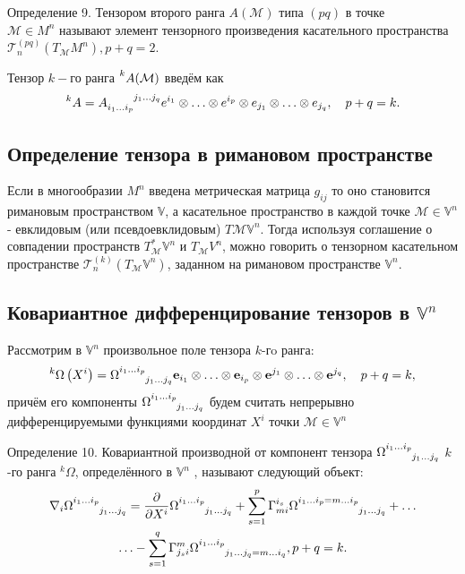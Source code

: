 \documentclass[14pt,a4paper]{extarticle}
\begin{document}
Определение 9. Тензором второго ранга $A(\mathcal{M})$ типа $(pq)$ в точке \\$\mathcal{M} \in M^n$ называют элемент тензорного произведения касательного пространства $\mathcal{T}_n^{(pq)} (T_{\mathcal{M}}M^n), p+q=2$.

Тензор $k-$го ранга $\prescript{k}{}{A(\mathcal{M})}$ введём как 
\begin{equation}\label{eq22}
	\prescript{k}{}{A} = A\indices{_{i_1\ldots i_p}^{j_1 \ldots j_q}} e^{i_1} \otimes \ldots \otimes e^{i_p} \otimes e_{j_1} \otimes \ldots \otimes e_{j_q}, \quad p+q=k.
\end{equation}

\subsection{Определение тензора в римановом пространстве}
Если в многообразии $M^n$ введена метрическая матрица $g_{ij}$ то оно становится римановым пространством $\mathbb{V}$, а касательное пространство в каждой точке $\mathcal{M} \in \mathbb{V}^n$ - евклидовым (или псевдоевклидовым) $T\mathcal{M} \mathbb{V}^n$. Тогда используя соглашение о совпадении пространств $T_{\mathcal{M}}^*\mathbb{V}^n$ и $T_{\mathcal{M}}V^n$, можно говорить о тензорном касательном пространстве $\mathcal{T}_n^{(k)}(T_{\mathcal{M}}\mathbb{V}^n)$, заданном на римановом пространстве $\mathbb{V}^n$.


\subsection{Ковариантное дифференцирование тензоров в $\mathbb{V}^n$}
Рассмотрим в $\mathbb{V}^n$ произвольное поле тензора $k$-гo ранга:
\begin{equation}\label{eq23}
	^{k} \Omega\left(X^{i}\right)=\Omega\indices{^{i_{1} \ldots i_{p}}_{j_1 \ldots j_q }} \mathbf{e}_{i_{1}} \otimes \ldots \otimes \mathbf{e}_{i_{p}} \otimes \mathbf{e}^{j_{1}} \otimes \ldots \otimes \mathbf{e}^{j_{q}}, \quad p+q=k,
\end{equation}
причём его компоненты $\Omega\indices{^{i_{1} \ldots i_{p}}_{j_1 \ldots j_q }}$ будем считать непрерывно дифференцируемыми функциями координат $X^i$ точки $\mathcal{M} \in \mathbb{V}^n$

Определение 10. Ковариантной производной от компонент тензора $\Omega\indices{^{i_{1} \ldots i_{p}}_{j_1 \ldots j_q }}$ $k$-го ранга $^{k} \Omega$, определённого в $\mathbb{V}^n$ , называют следующий объект:
\begin{multline}\label{eq24}
	\nabla_i \Omega\indices{^{i_{1} \ldots i_{p}}_{j_1 \ldots j_q }} = \pdv{}{X^i} \Omega\indices{^{i_{1} \ldots i_{p}}_{j_1 \ldots j_q }} + \sum\limits_{s=1}^{p} \Gamma_{mi}^{i_s} \Omega\indices{^{i_{1} \ldots i_{p} = m \ldots i_p}_{j_1 \ldots j_q }} + \ldots \\ 
	\ldots - \sum\limits_{s=1}^q \Gamma_{j_si}^{m} \Omega\indices{^{i_{1} \ldots i_{p}}_{j_1 \ldots j_q = m \ldots i_q}}, p+q=k.
\end{multline}
\end{document}
